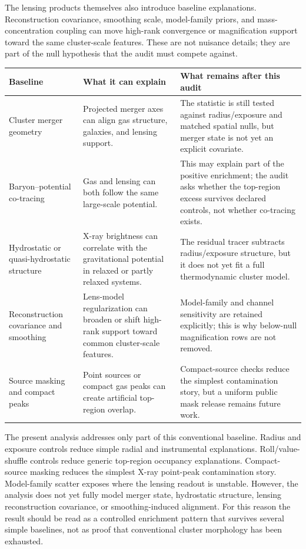 \documentclass[11pt,a4paper]{article}
\begin{document}
The lensing products themselves also introduce baseline explanations.
Reconstruction covariance, smoothing scale, model-family priors, and
mass-concentration coupling can move high-rank convergence or magnification
support toward the same cluster-scale features. These are not nuisance details;
they are part of the null hypothesis that the audit must compete against.

\begin{center}
\begin{tabular}{L{0.22\textwidth}L{0.31\textwidth}L{0.35\textwidth}}
\toprule
Baseline & What it can explain & What remains after this audit \\
\midrule
Cluster merger geometry &
Projected merger axes can align gas structure, galaxies, and lensing support. &
The statistic is still tested against radius/exposure and matched spatial
nulls, but merger state is not yet an explicit covariate. \\
Baryon--potential co-tracing &
Gas and lensing can both follow the same large-scale potential. &
This may explain part of the positive enrichment; the audit asks whether the
top-region excess survives declared controls, not whether co-tracing exists. \\
Hydrostatic or quasi-hydrostatic structure &
X-ray brightness can correlate with the gravitational potential in relaxed or
partly relaxed systems. &
The residual tracer subtracts radius/exposure structure, but it does not yet
fit a full thermodynamic cluster model. \\
Reconstruction covariance and smoothing &
Lens-model regularization can broaden or shift high-rank support toward common
cluster-scale features. &
Model-family and channel sensitivity are retained explicitly; this is why
below-null magnification rows are not removed. \\
Source masking and compact peaks &
Point sources or compact gas peaks can create artificial top-region overlap. &
Compact-source checks reduce the simplest contamination story, but a uniform
public mask release remains future work. \\
\bottomrule
\end{tabular}
\end{center}

The present analysis addresses only part of this conventional baseline. Radius
and exposure controls reduce simple radial and instrumental explanations.
Roll/value-shuffle controls reduce generic top-region occupancy explanations.
Compact-source masking reduces the simplest X-ray point-peak contamination
story. Model-family scatter exposes where the lensing readout is unstable.
However, the analysis does not yet fully model merger state, hydrostatic
structure, lensing reconstruction covariance, or smoothing-induced alignment.
For this reason the result should be read as a controlled enrichment pattern
that survives several simple baselines, not as proof that conventional cluster
morphology has been exhausted.
\end{document}
